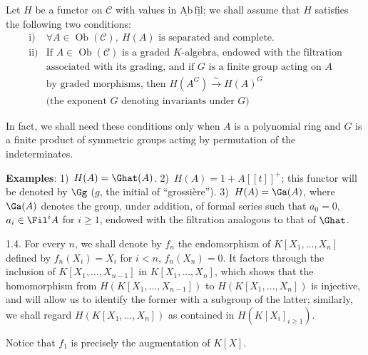 Let \(H\) be a functor on \(\mathcal C\) with values in \(\underline{\mathrm{Ab}}\,\underline{\mathrm{fil}}\); we shall assume that \(H\) satisfies the following two conditions:
\[
\begin{array}{ll}
\text{i)} & \forall A\in\operatorname{Ob}(\mathcal C),\ H(A)\text{ is separated and complete}.\\[0.3em]
\text{ii)} & \text{If }A\in\operatorname{Ob}(\mathcal C)\text{ is a graded }K\text{-algebra, endowed with the filtration}\\
& \text{associated with its grading, and if }G\text{ is a finite group acting on }A\\
& \text{by graded morphisms, then }H(A^G)\xrightarrow{\sim} H(A)^G\\
& \text{(the exponent }G\text{ denoting invariants under }G\text{)}
\end{array}
\]

In fact, we shall need these conditions only when \(A\) is a polynomial ring and \(G\) is a finite product of symmetric groups acting by permutation of the indeterminates.

\textbf{Examples}: 1)~\(H(A)=\Ghat(A)\). 2)~\(H(A)=1+A[[t]]^+\); this functor will be denoted by \(\Gg\) (\(g\), the initial of ``grossière''). 3)~\(H(A)=\Ga(A)\), where \(\Ga(A)\) denotes the group, under addition, of formal series such that \(a_0=0\), \(a_i\in\Fil^i A\) for \(i\geq 1\), endowed with the filtration analogous to that of \(\Ghat\).

1.4. For every \(n\), we shall denote by \(f_n\) the endomorphism of \(K[X_1,\ldots,X_n]\)
%
defined by \(f_n(X_i)=X_i\) for \(i<n\), \(f_n(X_n)=0\). It factors through the inclusion of \(K[X_1,\ldots,X_{n-1}]\) in \(K[X_1,\ldots,X_n]\), which shows that the homomorphism from \(H(K[X_1,\ldots,X_{n-1}])\) to \(H(K[X_1,\ldots,X_n])\) is injective, and will allow us to identify the former with a subgroup of the latter; similarly, we shall regard \(H(K[X_1,\ldots,X_n])\) as contained in \(H(K[X_i]_{i\geq 1})\).

Notice that \(f_1\) is precisely the augmentation of \(K[X]\).

